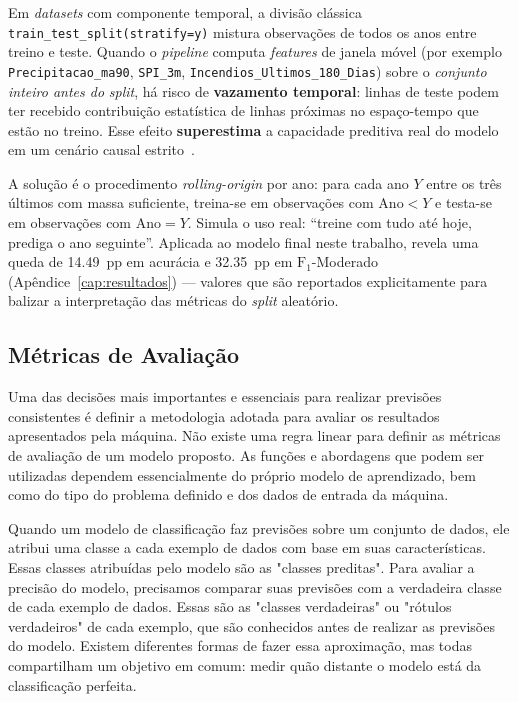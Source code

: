 \documentclass[tcc2]{uftex}
\begin{document}
Em \emph{datasets} com componente temporal, a divisão clássica \texttt{train\_test\_split(stratify=y)} mistura observações de todos os anos entre treino e teste. Quando o \emph{pipeline} computa \emph{features} de janela móvel (por exemplo \texttt{Precipitacao\_ma90}, \texttt{SPI\_3m}, \texttt{Incendios\_Ultimos\_180\_Dias}) sobre o \emph{conjunto inteiro antes do} \emph{split}, há risco de \textbf{vazamento temporal}: linhas de teste podem ter recebido contribuição estatística de linhas próximas no espaço-tempo que estão no treino. Esse efeito \textbf{superestima} a capacidade preditiva real do modelo em um cenário causal estrito~\cite{bergmeir2012cv}.

A solução é o procedimento \emph{rolling-origin} por ano: para cada ano \(Y\) entre os três últimos com massa suficiente, treina-se em observações com \(\text{Ano} < Y\) e testa-se em observações com \(\text{Ano} = Y\). Simula o uso real: ``treine com tudo até hoje, prediga o ano seguinte''. Aplicada ao modelo final neste trabalho, revela uma queda de \SI{14,49}{pp} em acurácia e \SI{32,35}{pp} em \(\text{F}_1\)-Moderado (Apêndice~\ref{cap:resultados}) --- valores que são reportados explicitamente para balizar a interpretação das métricas do \emph{split} aleatório.

\subsection{Métricas de Avaliação}

Uma das decisões mais importantes e essenciais para realizar previsões consistentes é definir a metodologia adotada para avaliar os resultados apresentados pela máquina. Não existe uma regra linear para definir as métricas de avaliação de um modelo proposto. As funções e abordagens que podem ser utilizadas dependem essencialmente do próprio modelo de aprendizado, bem como do tipo do problema definido e dos dados de entrada da máquina.

Quando um modelo de classificação faz previsões sobre um conjunto de dados, ele atribui uma classe a cada exemplo de dados com base em suas características. Essas classes atribuídas pelo modelo são as "classes preditas". Para avaliar a precisão do modelo, precisamos comparar suas previsões com a verdadeira classe de cada exemplo de dados. Essas são as "classes verdadeiras" ou "rótulos verdadeiros" de cada exemplo, que são conhecidos antes de realizar as previsões do modelo. Existem diferentes formas de fazer essa aproximação, mas todas compartilham um objetivo em comum: medir quão distante o modelo está da classificação perfeita.
\end{document}
